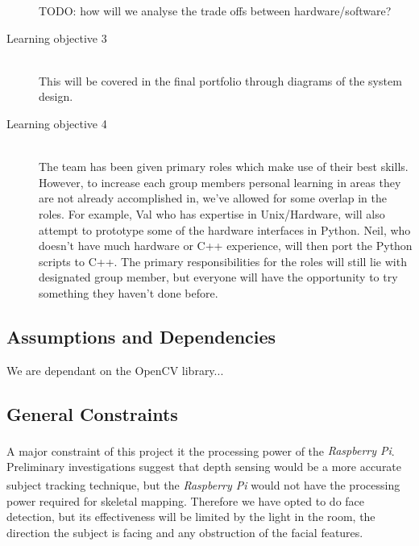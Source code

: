 \documentclass[11pt,a4paper,titlepage]{report}
\newcommand{\rpi}{\textit{Raspberry Pi\textsuperscript{\textregistered}}}
\begin{document}
\begin{description}
{\color{red} TODO: how will we analyse the trade offs between hardware/software?}


  \item[Learning objective 3] \hfill \\
This will be covered in the final portfolio through diagrams of the system design.

  \item[Learning objective 4] \hfill \\
The team has been given primary roles which make use of their best skills. However, to increase each group members personal learning in areas they are not already accomplished in, we've allowed for some overlap in the roles. For example, Val who has expertise in Unix/Hardware, will also attempt to prototype some of the hardware interfaces in Python. Neil, who doesn't have much hardware or C++ experience, will then port the Python scripts to C++. The primary responsibilities for the roles will still lie with designated group member, but everyone will have the opportunity to try something they haven't done before.

\end{description}




\subsection{Assumptions and Dependencies}

{\color{red} We are dependant on the OpenCV library...}

\subsection{General Constraints}

A major constraint of this project it the processing power of the \rpi. Preliminary investigations suggest that depth sensing would be a more accurate subject tracking technique, but the \rpi\xspace would not have the processing power required for skeletal mapping. Therefore we have opted to do face detection, but its effectiveness will be limited by the light in the room, the direction the subject is facing and any obstruction of the facial features.
\end{document}
